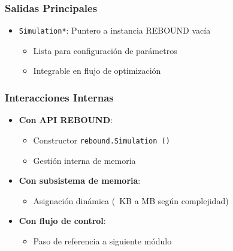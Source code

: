\subsubsection{Salidas Principales}
\begin{itemize}
    \item \texttt{Simulation*}: Puntero a instancia REBOUND vacía
    \begin{itemize}
        \item Lista para configuración de parámetros
        \item Integrable en flujo de optimización
    \end{itemize}
\end{itemize}

\subsubsection{Interacciones Internas}
\begin{itemize}
    \item \textbf{Con API REBOUND}:
    \begin{itemize}
        \item Constructor \texttt{rebound.Simulation~()}
        \item Gestión interna de memoria
    \end{itemize}
    \item \textbf{Con subsistema de memoria}:
    \begin{itemize}
        \item Asignación dinámica (~KB a MB según complejidad)
    \end{itemize}
    \item \textbf{Con flujo de control}:
    \begin{itemize}
        \item Paso de referencia a siguiente módulo
    \end{itemize}
\end{itemize}

